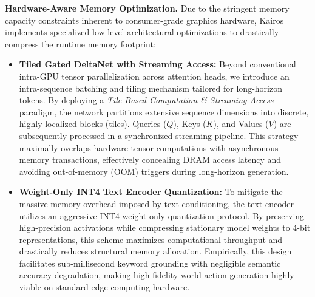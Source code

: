 \textbf{Hardware-Aware Memory Optimization.} Due to the stringent memory capacity constraints inherent to consumer-grade graphics hardware, Kairos implements specialized low-level architectural optimizations to drastically compress the runtime memory footprint:

\begin{itemize}

    \item \textbf{Tiled Gated DeltaNet with Streaming Access:} Beyond conventional intra-GPU tensor parallelization across attention heads, we introduce an intra-sequence batching and tiling mechanism tailored for long-horizon tokens. By deploying a \textit{Tile-Based Computation \& Streaming Access} paradigm, the network partitions extensive sequence dimensions into discrete, highly localized blocks (tiles). Queries ($Q$), Keys ($K$), and Values ($V$) are subsequently processed in a synchronized streaming pipeline. This strategy maximally overlaps hardware tensor computations with asynchronous memory transactions, effectively concealing DRAM access latency and avoiding out-of-memory (OOM) triggers during long-horizon generation.
	
    \item \textbf{Weight-Only INT4 Text Encoder Quantization:} To mitigate the massive memory overhead imposed by text conditioning, the text encoder utilizes an aggressive INT4 weight-only quantization protocol. By preserving high-precision activations while compressing stationary model weights to 4-bit representations, this scheme maximizes computational throughput and drastically reduces structural memory allocation. Empirically, this design facilitates sub-millisecond keyword grounding with negligible semantic accuracy degradation, making high-fidelity world-action generation highly viable on standard edge-computing hardware.

\end{itemize}

